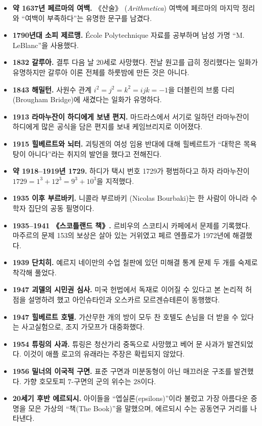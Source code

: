 \begin{itemize}
\item \textbf{약 1637년 페르마의 여백.} 《산술》 (\textit{Arithmetica}) 여백에 페르마의 마지막 정리와 ``여백이 부족하다''는 유명한 문구를 남겼다.
\item \textbf{1790년대 소피 제르맹.} École Polytechnique 자료를 공부하며 남성 가명 ``M. LeBlanc''을 사용했다.
\item \textbf{1832 갈루아.} 결투 다음 날 20세로 사망했다. 전날 원고를 급히 정리했다는 일화가 유명하지만 갈루아 이론 전체를 하룻밤에 만든 것은 아니다.
\item \textbf{1843 해밀턴.} 사원수 관계 $i^2=j^2=k^2=ijk=-1$을 더블린의 브룸 다리(Brougham Bridge)에 새겼다는 일화가 유명하다.
\item \textbf{1913 라마누잔이 하디에게 보낸 편지.} 마드라스에서 서기로 일하던 라마누잔이 하디에게 많은 공식을 담은 편지를 보내 케임브리지로 이어졌다.
\item \textbf{1915 힐베르트와 뇌터.} 괴팅겐의 여성 임용 반대에 대해 힐베르트가 ``대학은 목욕탕이 아니다''라는 취지의 발언을 했다고 전해진다.
\item \textbf{약 1918--1919년 1729.} 하디가 택시 번호 1729가 평범하다고 하자 라마누잔이 $1729=1^3+12^3=9^3+10^3$을 지적했다.
\item \textbf{1935 이후 부르바키.} 니콜라 부르바키 (Nicolas Bourbaki)는 한 사람이 아니라 수학자 집단의 공동 필명이다.
\item \textbf{1935--1941 《스코틀랜드 책》.} 르비우의 스코티시 카페에서 문제를 기록했다. 마주르의 문제 153의 보상은 살아 있는 거위였고 페르 엔플로가 1972년에 해결했다.
\item \textbf{1939 단치히.} 예르지 네이만의 수업 칠판에 있던 미해결 통계 문제 두 개를 숙제로 착각해 풀었다.
\item \textbf{1947 괴델의 시민권 심사.} 미국 헌법에서 독재로 이어질 수 있다고 본 논리적 허점을 설명하려 했고 아인슈타인과 오스카르 모르겐슈테른이 동행했다.
\item \textbf{1947 힐베르트 호텔.} 가산무한 개의 방이 모두 찬 호텔도 손님을 더 받을 수 있다는 사고실험으로, 조지 가모프가 대중화했다.
\item \textbf{1954 튜링의 사과.} 튜링은 청산가리 중독으로 사망했고 베어 문 사과가 발견되었다. 이것이 애플 로고의 유래라는 주장은 확립되지 않았다.
\item \textbf{1956 밀너의 이국적 구면.} 표준 구면과 미분동형이 아닌 매끄러운 구조를 발견했다. 가향 호모토피 $7$-구면의 군의 위수는 $28$이다.
\item \textbf{20세기 후반 에르되시.} 아이들을 ``엡실론(epsilons)''이라 불렀고 가장 아름다운 증명을 모은 가상의 ``책(The Book)''을 말했으며, 에르되시 수는 공동연구 거리를 나타낸다.

\end{itemize}
